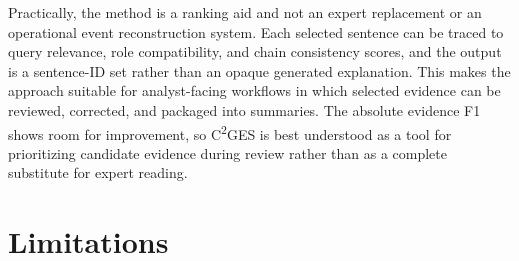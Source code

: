 \documentclass{ieeeaccess}
\begin{document}
Practically, the method is a ranking aid and not an expert replacement or an operational event reconstruction system. Each selected sentence can be traced to query relevance, role compatibility, and chain consistency scores, and the output is a sentence-ID set rather than an opaque generated explanation. This makes the approach suitable for analyst-facing workflows in which selected evidence can be reviewed, corrected, and packaged into summaries. The absolute evidence F1 shows room for improvement, so C\textsuperscript{2}GES is best understood as a tool for prioritizing candidate evidence during review rather than as a complete substitute for expert reading.

\section{Limitations}

\label{sec:limitations}
\end{document}
